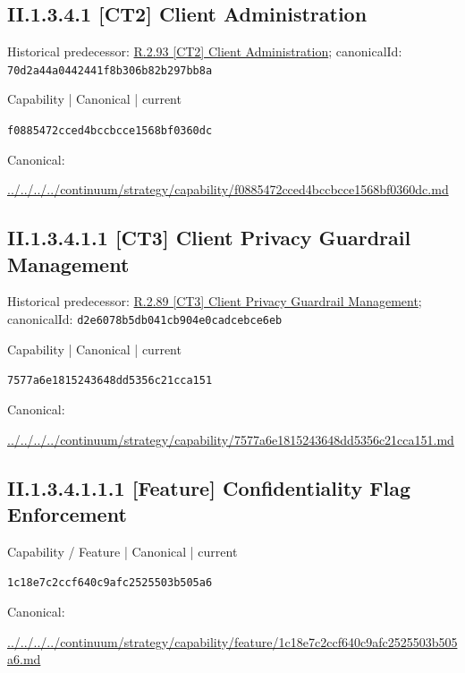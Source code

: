 \documentclass[10pt,a4paper]{article}
\begin{document}
\subsection*{II.1.3.4.1 [CT2] Client Administration}
Historical predecessor: \hyperref[element-70d2a44a0442441f8b306b82b297bb8a]{R.2.93 [CT2] Client Administration}; canonicalId: \texttt{70d2a44a0442441f8b306b82b297bb8a}\par
\label{element-f0885472cced4bccbcce1568bf0360dc}
{\small Capability | Canonical | current}\par
\texttt{f0885472cced4bccbcce1568bf0360dc}\par
Canonical: \par
{\footnotesize\url{../../../../continuum/strategy/capability/f0885472cced4bccbcce1568bf0360dc.md}}\par
\subsection*{II.1.3.4.1.1 [CT3] Client Privacy Guardrail Management}
Historical predecessor: \hyperref[element-d2e6078b5db041cb904e0cadcebce6eb]{R.2.89 [CT3] Client Privacy Guardrail Management}; canonicalId: \texttt{d2e6078b5db041cb904e0cadcebce6eb}\par
\label{element-7577a6e1815243648dd5356c21cca151}
{\small Capability | Canonical | current}\par
\texttt{7577a6e1815243648dd5356c21cca151}\par
Canonical: \par
{\footnotesize\url{../../../../continuum/strategy/capability/7577a6e1815243648dd5356c21cca151.md}}\par
\subsection*{II.1.3.4.1.1.1 [Feature] Confidentiality Flag Enforcement}
\label{element-1c18e7c2ccf640c9afc2525503b505a6}
{\small Capability / Feature | Canonical | current}\par
\texttt{1c18e7c2ccf640c9afc2525503b505a6}\par
Canonical: \par
{\footnotesize\url{../../../../continuum/strategy/capability/feature/1c18e7c2ccf640c9afc2525503b505a6.md}}\par
\end{document}
